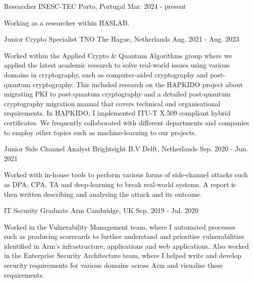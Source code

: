 \begin{cventries}
  \cventry
  {Researcher}
  {INESC-TEC}
  {Porto, Portugal}
  {Mar. 2024 - present}
  {
    \begin{cvitems}
      \item{Working as a researcher within HASLAB.}
    \end{cvitems}
  }
  \cventry
  {Junior Crypto Specialist}
  {TNO}
  {The Hague, Netherlands}
  {Aug. 2021 - Aug. 2023}
  {
    \begin{cvitems}
      \item{Worked within the Applied Crypto \& Quantum Algorithms group where we applied the latest academic research to solve real-world issues using various domains in cryptography, such as computer-aided cryptography and post-quantum cryptography. This included research on the HAPKIDO project about migrating PKI to post-quantum cryptography and a detailed post-quantum cryptography migration manual that covers technical and organisational requirements. In HAPKIDO, I implemented ITU-T X.509 compliant hybrid certificates. We frequently collaborated with different departments and companies to employ other topics such as machine-learning to our projects.}
    \end{cvitems}
  }
  \cventry
  {Junior Side Channel Analyst}
  {Brightsight B.V}
  {Delft, Netherlands}
  {Sep. 2020 - Jun. 2021}
  {
    \begin{cvitems}
      \item{Worked with in-house tools to perform various forms of side-channel attacks such as DPA, CPA, TA and deep-learning to break real-world systems. A report is then written describing and analysing the attack and its outcome.}
    \end{cvitems}
  }


  \cventry
  {IT Security Graduate}
  {Arm}
  {Cambridge, UK}
  {Sep. 2019 - Jul. 2020}
  {
    \begin{cvitems}
      \item{Worked in the Vulnerability Management team, where I automated processes such as producing scorecards to further understand and prioritise vulnerabilities identified in Arm's infrastructure, applications and web applications. Also worked in the Enterprise Security Architecture team, where I helped write and develop security requirements for various domains across Arm and visualise these requirements.}
    \end{cvitems}
  }


\end{cventries}
